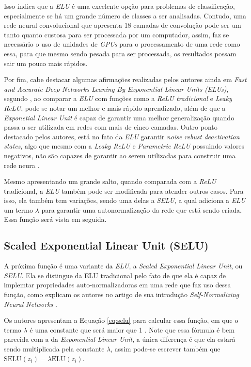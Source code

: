 Isso indica que a \textit{ELU} é uma excelente opção para problemas de classificação, especialmente se há um grande número de classes a ser analisadas. Contudo, uma rede neural convolucional que apresenta 18 camadas de convolução pode ser um tanto quanto custosa para ser processada por um computador, assim, faz se necessário o uso de unidades de \textit{GPUs} para o processamento de uma rede como essa, para que mesmo sendo pesada para ser processada, os resultados possam sair um pouco mais rápidos.

Por fim, cabe destacar algumas afirmações realizadas pelos autores ainda em \textit{Fast and Accurate Deep Networks Leaning By Exponential Linear Units (ELUs)}, segundo \textcite{ELUArticle}, ao comparar a \textit{ELU} com funções como a \textit{ReLU tradicional} e \textit{Leaky ReLU}, pode-se notar um melhor e mais rápido aprendizado, além de que a \textit{Exponetial Linear Unit} é capaz de garantir uma melhor generalização quando passa a ser utilizada em redes com mais de cinco camadas. Outro ponto destacado pelos autores, está no fato da \textit{ELU} garantir \textit{noise rebust deactivation states}, algo que mesmo com a \textit{Leaky ReLU} e \textit{Parametric ReLU} possuindo valores negativos, não são capazes de garantir ao serem utilizadas para construir uma rede neura \parencite{ELUArticle}.

Mesmo apresentando um grande salto, quando comparada com a \textit{ReLU} tradicional, a \textit{ELU} também pode ser modificada para atender outros casos. Para isso, ela também tem variações, sendo uma delas a \textit{SELU}, a qual adiciona a \textit{ELU} um termo $\lambda$ para garantir uma autonormalização da rede que está sendo criada. Essa função será vista em seguida.

\subsection{Scaled Exponential Linear Unit (SELU)}

A próxima função é uma variante da \textit{ELU}, a \textit{Scaled Exponential Linear Unit}, ou \textit{SELU}. Ela se distingue da ELU tradicional pelo fato de que ela é capaz de implemtar propriedades auto-normalizadoras em uma rede que faz uso dessa função, como explicam os autores no artigo de sua introdução \textit{Self-Normalizing Neural Networks} \parencite{SELUArticle}.

Os autores apresentam a Equação \ref{eq:selu} para calcular essa função, em que o termo $\lambda$ é uma constante que será maior que 1 \parencite{SELUArticle}. Note que essa fórmula é bem parecida com a da \textit{Exponential Linear Unit}, a única diferença é que ela estará sendo multiplicada pela constante $\lambda$, assim pode-se escrever também que $\text{SELU}(z_i) = \lambda \text{ELU}(z_i)$.

